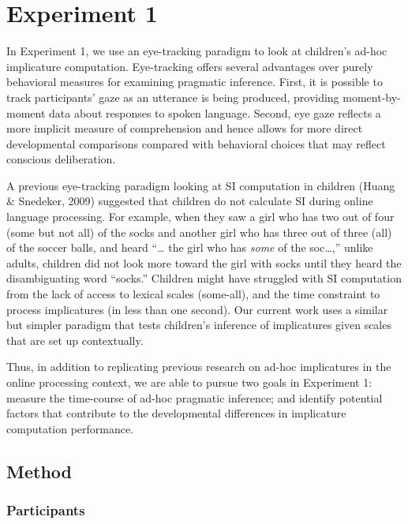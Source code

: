 \documentclass[a4paper,man,apacite,floatsintext]{apa6}
\begin{document}
\section{Experiment 1}\label{experiment-1}

In Experiment 1, we use an eye-tracking paradigm to look at children's
ad-hoc implicature computation. Eye-tracking offers several advantages
over purely behavioral measures for examining pragmatic inference.
First, it is possible to track participants' gaze as an utterance is
being produced, providing moment-by-moment data about responses to
spoken language. Second, eye gaze reflects a more implicit measure of
comprehension and hence allows for more direct developmental comparisons
compared with behavioral choices that may reflect conscious
deliberation.

A previous eye-tracking paradigm looking at SI computation in children
(Huang \& Snedeker, 2009) suggested that children do not calculate SI
during online language processing. For example, when they saw a girl who
has two out of four (some but not all) of the socks and another girl who
has three out of three (all) of the soccer balls, and heard ``\ldots{}
the girl who has \emph{some} of the soc\ldots{},'' unlike adults,
children did not look more toward the girl with socks until they heard
the disambiguating word ``socks.'' Children might have struggled with SI
computation from the lack of access to lexical scales (some-all), and
the time constraint to process implicatures (in less than one second).
Our current work uses a similar but simpler paradigm that tests
children's inference of implicatures given scales that are set up
contextually.

Thus, in addition to replicating previous research on ad-hoc
implicatures in the online processing context, we are able to pursue two
goals in Experiment 1: measure the time-course of ad-hoc pragmatic
inference; and identify potential factors that contribute to the
developmental differences in implicature computation performance.

\subsection{Method}\label{method}

\subsubsection{Participants}\label{participants}
\end{document}
